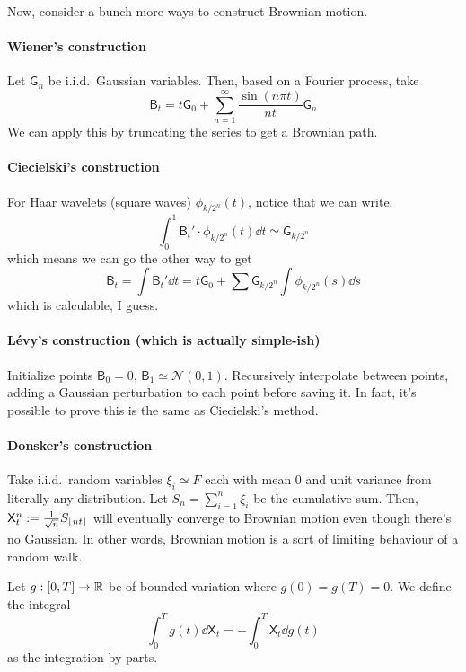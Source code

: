\documentclass[notes]{agony}
\newcommand{\rv}{\mathsf}
\renewcommand{\N}{\mathcal{N}}
\begin{document}
Now, consider a bunch more ways to construct Brownian motion.

\paragraph{Wiener's construction}
Let $\rv G_n$ be i.i.d.\ Gaussian variables.
Then, based on a Fourier process, take
\[ \rv B_t = t\rv G_0 + \sum_{n=1}^\infty \frac{\sin(n\pi t)}{nt} \rv G_n \]
We can apply this by truncating the series to get a Brownian path.

\paragraph{Ciecielski's construction}
For Haar wavelets (square waves) $\phi_{k/2^n}(t)$, notice that we can write:
\[
	\int_0^1 \rv B_t' \cdot \phi_{k/2^n}(t) \dd t \simeq \rv G_{k/2^n}	
\]
which means we can go the other way to get
\[
	\rv B_t = \int \rv B_t' \dd{t} = t\rv G_0 + \sum \rv G_{k/2^n} \int \phi_{k/2^n}(s) \dd{s}
\]
which is calculable, I guess.

\paragraph{Lévy's construction \rm (which is actually simple-ish)}
Initialize points $\rv B_0 = 0$, $\rv B_1 \simeq \N(0,1)$.
Recursively interpolate between points, adding a Gaussian perturbation
to each point before saving it.
In fact, it's possible to prove this is the same as Ciecielski's method.

\paragraph{Donsker's construction} Take i.i.d.\ random variables $\xi_i \simeq F$
each with mean 0 and unit variance from literally any distribution.
Let $S_n = \sum_{i=1}^n \xi_i$ be the cumulative sum.
Then, $\rv X_t^n := \frac{1}{\sqrt{n}}S_{\floor{nt}}$
will eventually converge to Brownian motion even though there's no Gaussian.
In other words, Brownian motion is a sort of limiting behaviour of a random walk.

\begin{defn}
	Let $g : [0,T] \to \mathbb{R}$ be of bounded variation where $g(0) = g(T) = 0$.
	We define the integral
	\[ \int_0^T g(t) \dd{\rv X_t} = -\int_0^T \rv X_t \dd{g(t)} \]
	as the integration by parts. 
\end{defn}
\end{document}
